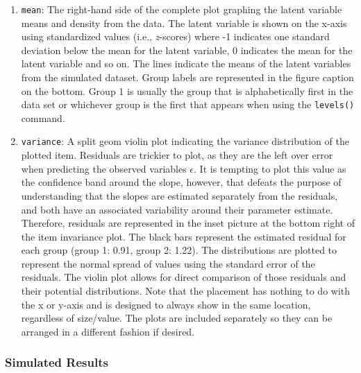 \documentclass[
  man]{apa7}
\begin{document}
\begin{enumerate}
\def\labelenumi{\arabic{enumi})}
\setcounter{enumi}{2}
\item
  \texttt{mean}: The right-hand side of the complete plot graphing the latent variable means and density from the data. The latent variable is shown on the x-axis using standardized values (i.e., \emph{z}-scores) where -1 indicates one standard deviation below the mean for the latent variable, 0 indicates the mean for the latent variable and so on. The lines indicate the means of the latent variables from the simulated dataset. Group labels are represented in the figure caption on the bottom. Group 1 is usually the group that is alphabetically first in the data set or whichever group is the first that appears when using the \texttt{levels()} command.
\item
  \texttt{variance}: A split geom violin plot indicating the variance distribution of the plotted item. Residuals are trickier to plot, as they are the left over error when predicting the observed variables \(\epsilon\). It is tempting to plot this value as the confidence band around the slope, however, that defeats the purpose of understanding that the slopes are estimated separately from the residuals, and both have an associated variability around their parameter estimate. Therefore, residuals are represented in the inset picture at the bottom right of the item invariance plot. The black bars represent the estimated residual for each group (group 1: 0.91, group 2: 1.22). The distributions are plotted to represent the normal spread of values using the standard error of the residuals. The violin plot allows for direct comparison of those residuals and their potential distributions. Note that the placement has nothing to do with the x or y-axis and is designed to always show in the same location, regardless of size/value. The plots are included separately so they can be arranged in a different fashion if desired.
\end{enumerate}

\hypertarget{simulated-results}{%
\subsubsection{Simulated Results}\label{simulated-results}}
\end{document}
